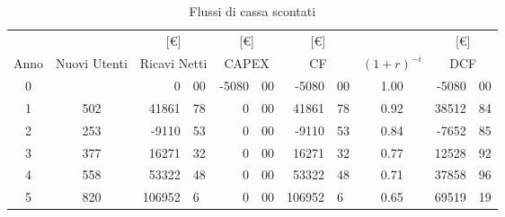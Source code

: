 \begin{table}[!h]
\centering
\begin{tabular}{c|c|r@{.}l|r@{.}l|r@{.}l|c|r@{.}l}
& 
& \multicolumn{2}{|c}{[\euro]}
& \multicolumn{2}{|c}{[\euro]}
& \multicolumn{2}{|c|}{[\euro]}
& 
& \multicolumn{2}{|c}{[\euro]}
\\
Anno
& Nuovi Utenti
& \multicolumn{2}{|c}{Ricavi Netti}
& \multicolumn{2}{|c}{CAPEX}
& \multicolumn{2}{|c|}{CF}
& $(1+r)^{-i}$
& \multicolumn{2}{|c}{DCF}
\\

\hline
0 &      &      0&00 & -5080&00&  -5080&00 &1.00& -5080&00 \\
1 & 502  &  41861&78 &     0&00&  41861&78 &0.92& 38512&84 \\ 
2 & 253  &  -9110&53 &     0&00&  -9110&53 &0.84& -7652&85 \\
3 & 377  &  16271&32 &     0&00&  16271&32 &0.77& 12528&92 \\
4 & 558  &  53322&48 &     0&00&  53322&48 &0.71& 37858&96 \\
5 & 820  & 106952&6  &     0&00& 106952&6  &0.65& 69519&19
\end{tabular}
\caption{Flussi di cassa scontati}
\label{tab:dcf}
\end{table}
